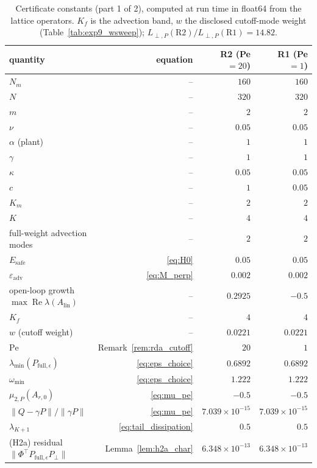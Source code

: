 \begin{table}[t]
\centering
\caption{Certificate constants (part 1 of 2), computed at run time in float64 from the lattice operators. $K_f$ is the advection band, $w$ the disclosed cutoff-mode weight (Table~\ref{tab:exp9_wsweep}); $L_{\perp,P}(\mathrm{R2})/L_{\perp,P}(\mathrm{R1})=14.82$.}
\label{tab:exp1_constants}
\footnotesize
\setlength{\tabcolsep}{4pt}
\begin{tabular}{lrrr}
\toprule
quantity & equation & R2 (Pe $= 20$) & R1 (Pe $= 1$) \\
\midrule
$N_m$ & -- & $160$ & $160$ \\
$N$ & -- & $320$ & $320$ \\
$m$ & -- & $2$ & $2$ \\
$\nu$ & -- & $0.05$ & $0.05$ \\
$\alpha$ (plant) & -- & $1$ & $1$ \\
$\gamma$ & -- & $1$ & $1$ \\
$\kappa$ & -- & $0.05$ & $0.05$ \\
$c$ & -- & $1$ & $0.05$ \\
$K_m$ & -- & $2$ & $2$ \\
$K$ & -- & $4$ & $4$ \\
full-weight advection modes & -- & $2$ & $2$ \\
$E_{\mathrm{safe}}$ & \eqref{eq:H0} & $0.05$ & $0.05$ \\
$\varepsilon_{\mathrm{adv}}$ & \eqref{eq:M_perp} & $0.002$ & $0.002$ \\
open-loop growth $\max\operatorname{Re}\lambda(A_{\mathrm{lin}})$ & -- & $0.2925$ & $-0.5$ \\
$K_f$ & -- & $4$ & $4$ \\
$w$ (cutoff weight) & -- & $0.0221$ & $0.0221$ \\
$\mathrm{Pe}$ & Remark~\ref{rem:rda_cutoff} & $20$ & $1$ \\
$\lambda_{\min}(P_{\mathrm{full},\epsilon})$ & \eqref{eq:eps_choice} & $0.6892$ & $0.6892$ \\
$\omega_{\min}$ & \eqref{eq:eps_choice} & $1.222$ & $1.222$ \\
$\mu_{2,P}(A_{r,0})$ & \eqref{eq:mu_pe} & $-0.5$ & $-0.5$ \\
$\|Q-\gamma P\|/\|\gamma P\|$ & \eqref{eq:mu_pe} & $7.039\times10^{-15}$ & $7.039\times10^{-15}$ \\
$\lambda_{K+1}$ & \eqref{eq:tail_dissipation} & $0.5$ & $0.5$ \\
(H2a) residual $\|\Phi^\top P_{\mathrm{full},\epsilon}P_\perp\|$ & Lemma~\ref{lem:h2a_char} & $6.348\times10^{-13}$ & $6.348\times10^{-13}$ \\

\end{tabular}
\end{table}
